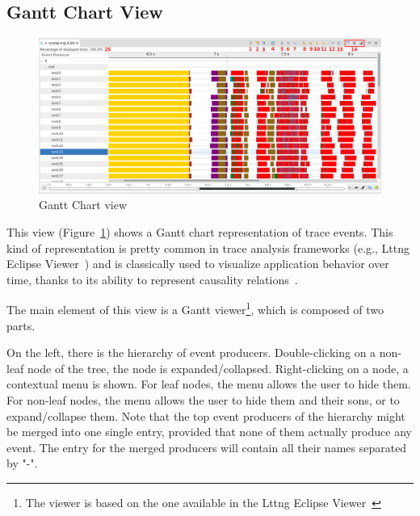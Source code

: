 \documentclass[twoside]{article}
\begin{document}
\begin{sloppypar}
\subsection{Gantt Chart View}
\label{subsec:gantt}

\begin{figure}[h!]
  \centering
    \includegraphics[width=1.0\textwidth]{images/gantt.png}
  \caption{Gantt Chart view}
  \label{fig:gantt}
\end{figure}

This view (Figure~\ref{fig:gantt}) shows a Gantt chart representation of trace events.
This kind of representation is pretty common in trace analysis frameworks (e.g., Lttng Eclipse Viewer~\cite{lttng_viewer}) and is classically used to visualize application behavior over time, thanks to its ability to represent causality relations~\cite{wilson_gantt_2003}.

The main element of this view is a Gantt viewer\footnote{The viewer is based on the one available in the Lttng Eclipse Viewer~\cite{lttng_viewer}}, which is composed of two parts.

On the left, there is the hierarchy of event producers.
Double-clicking on a non-leaf node of the tree, the node is expanded/collapsed.
Right-clicking on a node, a contextual menu is shown.
For leaf nodes, the menu allows the user to hide them.
For non-leaf nodes, the menu allows the user to hide them and their sons, or to expand/collapse them.
Note that the top event producers of the hierarchy might be merged into one single entry, provided that none of them actually produce any event. 
The entry for the merged producers will contain all their names separated by "-".


\end{sloppypar}
\end{document}

